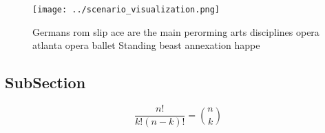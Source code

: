 \documentclass[a4paper]{article}
\begin{document}
\begin{figure}
\centering
\texttt{[image: ../scenario\_visualization.png]}
\caption{Germans rom slip ace are the main perorming arts disciplines opera atlanta opera ballet Standing beast annexation happe
}
\end{figure}
 
\subsection{SubSection}

\[ \frac{n!}{k!(n-k)!} = \binom{n}{k} \]
\end{document}
